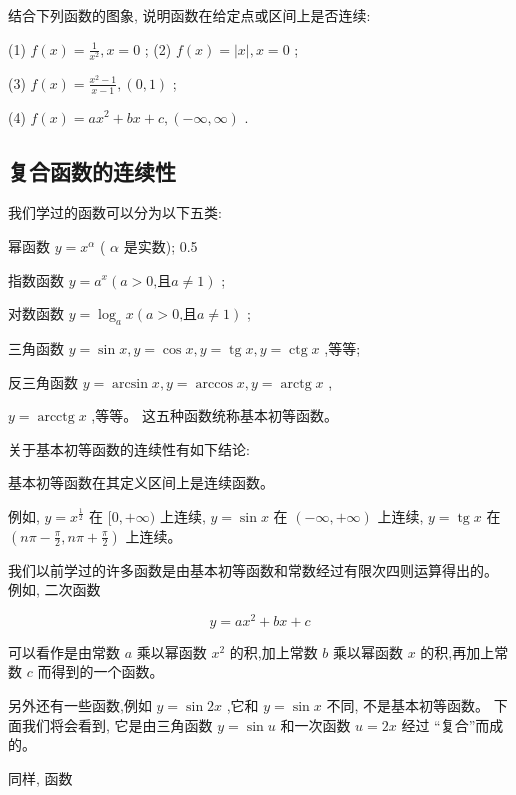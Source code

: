 \documentclass[lang=cn,newtx,12pt,scheme=chinese]{elegantbook}
\begin{document}
\begin{problemset}[练习]
\item 结合下列函数的图象, 说明函数在给定点或区间上是否连续:

(1) \(f\left( x\right) = \frac{1}{{x}^{2}},x = 0\) ; (2) \(f\left( x\right) = \left| x\right| ,x = 0\) ;

(3) \(f\left( x\right) = \frac{{x}^{2} - 1}{x - 1},\left( {0,1}\right)\) ;

(4) \(f\left( x\right) = a{x}^{2} + {bx} + c,\left( {-\infty ,\infty }\right)\) .

\end{problemset}

\subsection*{复合函数的连续性}
我们学过的函数可以分为以下五类: 

幂函数 \(y = {x}^{\alpha }\) ( \(\alpha\) 是实数); 0.5

指数函数 \(y = {a}^{x}\left( {a > 0\text{,且}a \neq 1}\right)\) ;

对数函数 \(y = {\log }_{a}x\left( {a > 0\text{,且}a \neq 1}\right)\) ;

三角函数 \(y = \sin x,y = \cos x,y = \operatorname{tg}x,y = \operatorname{ctg}x\) ,等等;

反三角函数 \(y = \arcsin x,y = \arccos x,y = \operatorname{arctg}x\) ,

\(y = \operatorname{arcctg}x\) ,等等。 这五种函数统称基本初等函数。

关于基本初等函数的连续性有如下结论:

基本初等函数在其定义区间上是连续函数。

例如, \(y = {x}^{\frac{1}{2}}\) 在 \(\lbrack 0, + \infty )\) 上连续, \(y = \sin x\) 在 \(\left( {-\infty , + \infty }\right)\) 上连续, \(y = \operatorname{tg}x\) 在 \(\left( {{n\pi } - \frac{\pi }{2},{n\pi } + \frac{\pi }{2}}\right)\) 上连续。

我们以前学过的许多函数是由基本初等函数和常数经过有限次四则运算得出的。 例如, 二次函数

\[
y = a{x}^{2} + {bx} + c
\]

可以看作是由常数 \(a\) 乘以幂函数 \({x}^{2}\) 的积,加上常数 \(b\) 乘以幂函数 \(x\) 的积,再加上常数 \(c\) 而得到的一个函数。

另外还有一些函数,例如 \(y = \sin {2x}\) ,它和 \(y = \sin x\) 不同, 不是基本初等函数。 下面我们将会看到, 它是由三角函数 \(y = \sin u\) 和一次函数 \(u = {2x}\) 经过 “复合”而成的。

同样, 函数
\end{document}
